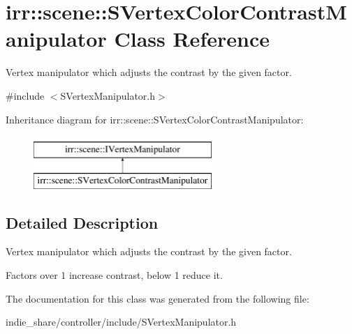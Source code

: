 \hypertarget{classirr_1_1scene_1_1SVertexColorContrastManipulator}{}\section{irr\+:\+:scene\+:\+:S\+Vertex\+Color\+Contrast\+Manipulator Class Reference}
\label{classirr_1_1scene_1_1SVertexColorContrastManipulator}


Vertex manipulator which adjusts the contrast by the given factor.  




{\ttfamily \#include $<$S\+Vertex\+Manipulator.\+h$>$}

Inheritance diagram for irr\+:\+:scene\+:\+:S\+Vertex\+Color\+Contrast\+Manipulator\+:\begin{figure}[H]
\begin{center}
\leavevmode
\includegraphics[height=2.000000cm]{classirr_1_1scene_1_1SVertexColorContrastManipulator}
\end{center}
\end{figure}


\subsection{Detailed Description}
Vertex manipulator which adjusts the contrast by the given factor. 

Factors over 1 increase contrast, below 1 reduce it. 

The documentation for this class was generated from the following file\+:\begin{DoxyCompactItemize}
\item 
indie\+\_\+share/controller/include/S\+Vertex\+Manipulator.\+h\end{DoxyCompactItemize}
